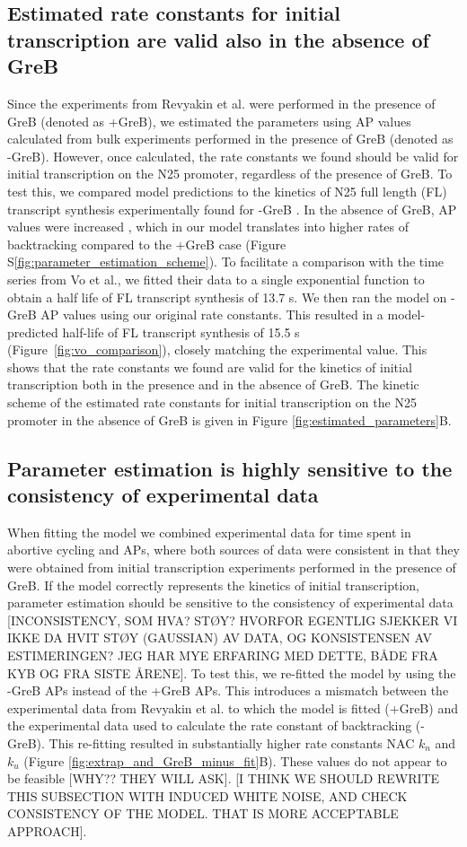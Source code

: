 \subsection{Estimated rate constants for initial transcription are valid also
in the absence of GreB}
Since the experiments from Revyakin et al. were performed in the presence of
GreB (denoted as +GreB), we estimated the parameters using AP values
calculated from bulk experiments performed in the presence of GreB (denoted as
-GreB). However, once calculated, the rate constants we found should be valid
for initial transcription on the N25 promoter, regardless of the presence of
GreB. To test this, we compared model predictions to the kinetics of N25 full
length (FL) transcript synthesis experimentally found for -GreB
\cite{vo_vitro_2003-1}. In the absence of GreB, AP values were increased
\cite{hsu_initial_2006}, which in our model translates into higher rates of
backtracking compared to the +GreB case (Figure
S\ref{fig:parameter_estimation_scheme}). To facilitate a comparison with the
time series from Vo et al., we fitted their data to a single exponential
function to obtain a half life of FL transcript synthesis of 13.7 s. We then
ran the model on -GreB AP values using our original rate constants. This
resulted in a model-predicted half-life of FL transcript synthesis of 15.5 s
(Figure~\ref{fig:vo_comparison}), closely matching the experimental value.
This shows that the rate constants we found are valid for the kinetics of
initial transcription both in the presence and in the absence of GreB. The
kinetic scheme of the estimated rate constants for initial transcription on
the N25 promoter in the absence of GreB is given in Figure
\ref{fig:estimated_parameters}B.

\subsection{Parameter estimation is highly sensitive to the consistency of experimental data}
When fitting the model we combined experimental data for time spent in
abortive cycling and APs, where both sources of data were consistent in that
they were obtained from initial transcription experiments performed in the
presence of GreB. If the model correctly represents the kinetics of initial
transcription, parameter estimation should be sensitive to the consistency of
experimental data [INCONSISTENCY, SOM HVA? STØY? HVORFOR EGENTLIG SJEKKER VI
IKKE DA HVIT STØY (GAUSSIAN) AV DATA, OG KONSISTENSEN AV ESTIMERINGEN? JEG HAR
MYE ERFARING MED DETTE, BÅDE FRA KYB OG FRA SISTE ÅRENE]. To test this, we
re-fitted the model by using the -GreB APs instead of the +GreB APs. This
introduces a mismatch between the experimental data from Revyakin et al. to
which the model is fitted (+GreB) and the experimental data used to calculate
the rate constant of backtracking (-GreB).  This re-fitting resulted in
substantially higher rate constants NAC $k_n$ and $k_u$ (Figure
\ref{fig:extrap_and_GreB_minus_fit}B). These values do not appear to be
feasible [WHY?? THEY WILL ASK].  [I THINK WE SHOULD REWRITE THIS SUBSECTION
WITH INDUCED WHITE NOISE, AND CHECK CONSISTENCY OF THE MODEL. THAT IS MORE
ACCEPTABLE APPROACH].  

